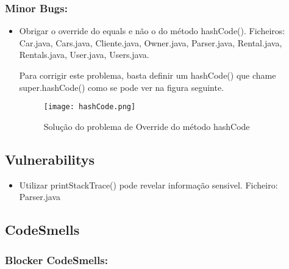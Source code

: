 \subsubsection{Minor Bugs:}
\begin{itemize}
\item Obrigar o override do equals e não o do método hashCode().\newline
 Ficheiros: Car.java, Cars.java, Cliente.java, Owner.java, Parser.java, Rental.java, Rentals.java, User.java, Users.java.\newline


\par Para corrigir este problema, basta definir um hashCode() que chame super.hashCode() como se pode ver na figura seguinte.

\begin{figure}[H]

  \centering

  \texttt{[image: hashCode.png]}

  \caption {Solução do problema de Override do método hashCode}

  \label {fig08}

\end{figure}

\end{itemize}


\subsection{Vulnerabilitys}
\begin{itemize}
\item Utilizar printStackTrace() pode revelar informação sensivel.\newline
 Ficheiro: Parser.java\newline
\end{itemize}

\subsection{CodeSmells}

\subsubsection{Blocker CodeSmells:}
